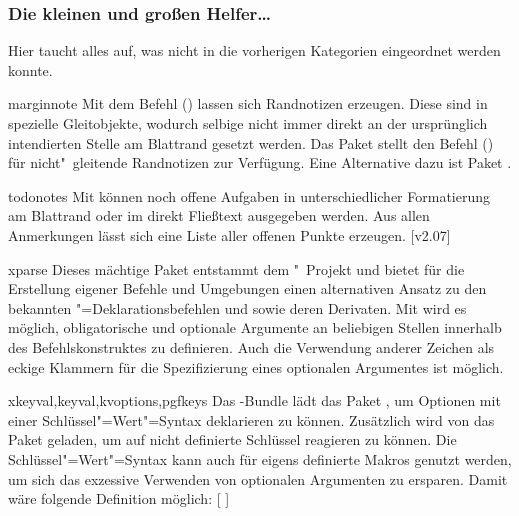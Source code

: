 \subsubsection{Die kleinen und großen Helfer\dots}
%
Hier taucht alles auf, was nicht in die vorherigen Kategorien eingeordnet 
werden konnte.
%
\begin{packages}
\item[marginnote]
  Mit dem Befehl () lassen sich 
  Randnotizen erzeugen. Diese sind in  spezielle Gleitobjekte, 
  wodurch selbige nicht immer direkt an der ursprünglich intendierten Stelle am 
  Blattrand gesetzt werden. Das Paket  stellt den Befehl 
  () für nicht"~gleitende Randnotizen zur 
  Verfügung. Eine Alternative dazu ist Paket .
\item[todonotes]
  Mit  können noch offene Aufgaben in unterschiedlicher 
  Formatierung am Blattrand oder im direkt Fließtext ausgegeben werden. Aus 
  allen Anmerkungen lässt sich eine Liste aller offenen Punkte erzeugen.
  [v2.07]
\item[xparse]
  Dieses mächtige Paket entstammt dem "~Projekt und bietet für 
  die Erstellung eigener Befehle und Umgebungen einen alternativen Ansatz zu 
  den bekannten "=Deklarationsbefehlen  und 
   sowie deren Derivaten. Mit  wird es 
  möglich, obligatorische und optionale Argumente an beliebigen Stellen 
  innerhalb des Befehlskonstruktes zu definieren. Auch die Verwendung anderer 
  Zeichen als eckige Klammern für die Spezifizierung eines optionalen 
  Argumentes ist möglich.
\item[xkeyval,keyval,kvoptions,pgfkeys]
  Das \KOMAScript-Bundle lädt das Paket , um Optionen mit 
  einer Schlüssel"=Wert"=Syntax deklarieren zu können. Zusätzlich wird von 
  \TUDScript das Paket  geladen, um auf nicht definierte 
  Schlüssel reagieren zu können. Die Schlüssel"=Wert"=Syntax kann auch für 
  eigens definierte Makros genutzt werden, um sich das exzessive Verwenden von 
  optionalen Argumenten zu ersparen. Damit wäre folgende Definition möglich:
  [%
  ]%
  

\end{packages}
